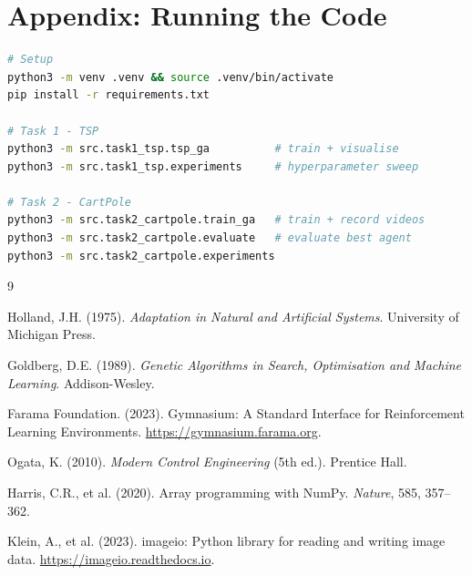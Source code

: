 \documentclass[12pt,a4paper]{article}
\begin{document}
\section*{Appendix: Running the Code}

\begin{lstlisting}[language=bash, caption={Setup and execution}]
# Setup
python3 -m venv .venv && source .venv/bin/activate
pip install -r requirements.txt

# Task 1 - TSP
python3 -m src.task1_tsp.tsp_ga          # train + visualise
python3 -m src.task1_tsp.experiments     # hyperparameter sweep

# Task 2 - CartPole
python3 -m src.task2_cartpole.train_ga   # train + record videos
python3 -m src.task2_cartpole.evaluate   # evaluate best agent
python3 -m src.task2_cartpole.experiments
\end{lstlisting}

\begin{thebibliography}{9}

Holland, J.H. (1975). \textit{Adaptation in Natural and Artificial Systems}. University of Michigan Press.

Goldberg, D.E. (1989). \textit{Genetic Algorithms in Search, Optimisation and Machine Learning}. Addison-Wesley.

Farama Foundation. (2023). Gymnasium: A Standard Interface for Reinforcement Learning Environments. \url{https://gymnasium.farama.org}.

Ogata, K. (2010). \textit{Modern Control Engineering} (5th ed.). Prentice Hall.

Harris, C.R., et al. (2020). Array programming with NumPy. \textit{Nature}, 585, 357--362.

Klein, A., et al. (2023). imageio: Python library for reading and writing image data. \url{https://imageio.readthedocs.io}.

\end{thebibliography}
\end{document}
